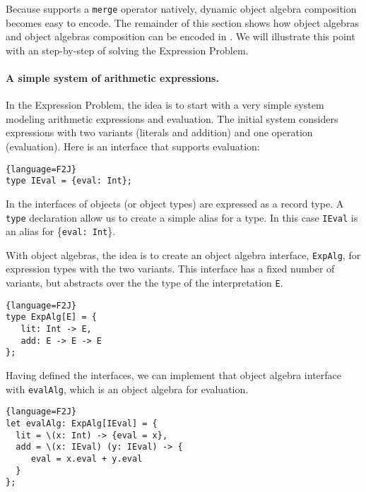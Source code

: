 Because \name supports a \lstinline{merge} operator natively, dynamic
object algebra composition becomes easy to encode. The remainder of
this section shows how object algebras and object algebras composition
can be encoded in \name. We will illustrate this point with an
step-by-step of solving the Expression Problem. 
 

\paragraph{A simple system of arithmetic expressions.} 
In the Expression Problem, the idea is to start with a very simple
system modeling arithmetic expressions and evaluation.
The initial system considers expressions with two variants (literals and
addition) and one operation (evaluation). Here is an interface that supports
evaluation:
\begin{lstlisting}{language=F2J}
type IEval = {eval: Int};
\end{lstlisting}

\noindent In \name the interfaces of objects (or object types) are expressed as
a record type. A \lstinline{type} declaration allow us to create a
simple alias for a type.  In this case \lstinline{IEval} is an alias
for \{\lstinline{eval: Int}\}.

With object algebras, the idea is to create an object algebra
interface, \lstinline$ExpAlg$, for expression types with the two
variants. This interface has a fixed number of variants, but abstracts over the
the type of the interpretation \lstinline$E$.

\begin{lstlisting}{language=F2J}
type ExpAlg[E] = {
   lit: Int -> E, 
   add: E -> E -> E
};
\end{lstlisting}
Having defined the interfaces, we can implement that object algebra interface
with \lstinline$evalAlg$, which is an object algebra for evaluation. 
\begin{lstlisting}{language=F2J}
let evalAlg: ExpAlg[IEval] = {
  lit = \(x: Int) -> {eval = x},
  add = \(x: IEval) (y: IEval) -> {
     eval = x.eval + y.eval
  }
};
\end{lstlisting}


